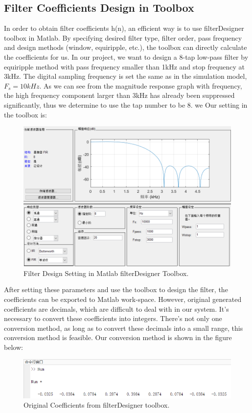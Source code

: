 \documentclass[a4paper]{article}
\begin{document}
\subsection{Filter Coefficients Design in Toolbox}
In order to obtain filter coefficients h(n), an efficient way is to use filterDesigner toolbox in Matlab. By specifying desired filter type, filter order, pass frequency and design methods (window, equiripple, etc.), the toolbox can directly calculate the coefficients for us. In our project, we want to design a 8-tap low-pass filter by equiripple method with pass frequency smaller than 1kHz and stop frequency at 3kHz. The digital sampling frequency is set the same as in the simulation model, $F_s = 10kHz$. As we can see from the magnitude response graph with frequency, the high frequency component larger than 3kHz has already been suppressed significantly, thus we determine to use the tap number to be 8. we Our setting in the toolbox is:
\begin{figure}[H]
    \centering
    \includegraphics[width=1\textwidth]{part2_1.png}
    \caption{Filter Design Setting in Matlab filterDesigner Toolbox.}
\end{figure}
After setting these parameters and use the toolbox to design the filter, the coefficients can be exported to Matlab work-space. However, original generated coefficients are decimals, which are difficult to deal with in our system. It's necessary to convert these coefficients into integers. There's not only one conversion method, as long as to convert these decimals into a small range, this conversion method is feasible. Our conversion method is shown in the figure below:
\begin{figure}[H]
    \centering
    \includegraphics[width=1\textwidth]{part2_2.png}
    \caption{Original Coefficients from filterDesigner toolbox.}
\end{figure}
\end{document}
